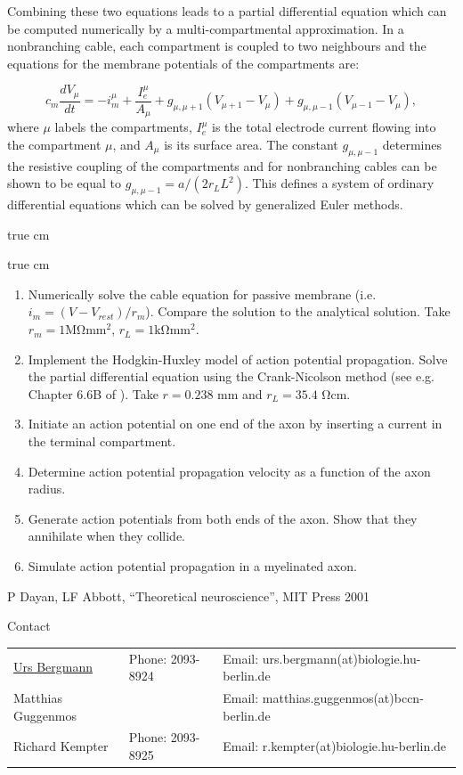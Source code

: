 \documentclass[12pt]{article}
\begin{document}
Combining these two equations leads to a partial differential equation
which can be computed numerically by a multi-compartmental approximation.
In a nonbranching cable, each compartment is coupled to two neighbours
and the equations for the membrane potentials of the compartments are:

\begin{equation}
   c_m\frac{dV_\mu}{dt}=-i^\mu_m +
    \frac{I^\mu_e}{A_\mu}+g_{\mu,\mu+1}(V_{\mu+1} -V_\mu)+g_{\mu,\mu-1}(V_{
    \mu-1}-V_{\mu}),
\end{equation}
where $\mu$ labels the compartments, $I^\mu_e$ is the total electrode
current flowing into the compartment $\mu$, and $A_\mu$ is its surface
area. The constant $g_{\mu,\mu-1}$ determines the resistive coupling
of the compartments and for nonbranching cables can be shown to be
equal to $g_{\mu,\mu-1}=a/(2r_LL^2)$. This defines a system of
ordinary differential equations which can be solved by generalized Euler
methods.

 true cm


 true cm

\begin{enumerate}
    \item Numerically solve the cable equation for passive membrane
        (i.e. $i_m=(V-V_{rest})/r_m$). Compare the solution to the analytical
        solution. Take $r_m=1\mathrm{M\Omega mm^2}$,
        $r_L=1\mathrm{k\Omega mm^2}$.
    \item Implement the Hodgkin-Huxley model of action potential
        propagation. Solve the partial differential equation using the
        Crank-Nicolson method (see e.g. Chapter 6.6B of \cite{dayan2001}).
        Take $r=0.238$ mm and $r_L=35.4$ $\mathrm{\Omega cm}$.
    \item Initiate an action potential on one end of the axon by
        inserting a current in the terminal compartment. 
    \item Determine action potential propagation velocity as a
        function of the axon radius.
    \item Generate action potentials from both ends of the axon. Show
        that they annihilate when they collide.
    \item Simulate action potential propagation in a myelinated axon.
\end{enumerate}

\begin{thebibliography}{7}
     P Dayan, LF Abbott, ``Theoretical neuroscience'',
        MIT Press 2001
\end{thebibliography}

\vfill
\centerline{\CAP Contact}
\CAP

\begin{tabular}{lll}
\underline{Urs Bergmann} & Phone: 2093-8924 & Email:
urs.bergmann(at)biologie.hu-berlin.de \\
Matthias Guggenmos & & Email: matthias.guggenmos(at)bccn-berlin.de \\
Richard Kempter \hfill & Phone: 2093-8925 \hfill & Email:
r.kempter(at)biologie.hu-berlin.de \\
\end{tabular}
\end{document}

